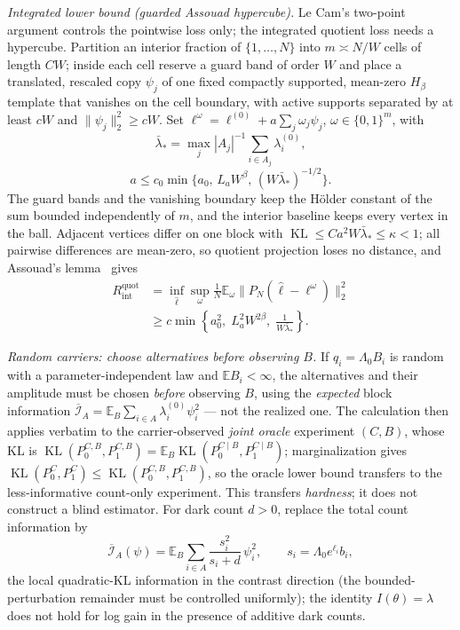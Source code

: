 \emph{Integrated lower bound (guarded Assouad hypercube).} Le Cam's two-point argument controls the pointwise loss only; the integrated quotient loss needs a hypercube. Partition an interior fraction of $\{1,\dots,N\}$ into $m\asymp N/W$ cells of length $CW$; inside each cell reserve a guard band of order $W$ and place a translated, rescaled copy $\psi_j$ of one fixed compactly supported, mean-zero $H_\beta$ template that vanishes on the cell boundary, with active supports separated by at least $cW$ and $\|\psi_j\|_2^2\ge cW$. Set $\ell^\omega=\ell^{(0)}+a\sum_j\omega_j\psi_j$, $\omega\in\{0,1\}^m$, with
\[
\bar\lambda_*=\max_j|A_j|^{-1}\sum_{i\in A_j}\lambda_i^{(0)},
\]
\[
a\le c_0\min\{a_0,\,L_aW^\beta,\,(W\bar\lambda_*)^{-1/2}\}.
\]
The guard bands and the vanishing boundary keep the H\"older constant of the sum bounded independently of $m$, and the interior baseline keeps every vertex in the ball. Adjacent vertices differ on one block with $\operatorname{KL}\le Ca^2W\bar\lambda_*\le\kappa<1$; all pairwise differences are mean-zero, so quotient projection loses no distance, and Assouad's lemma~\cite{Tsybakov2009} gives
\begin{equation}
\begin{aligned}
R_{\mathrm{int}}^{\mathrm{quot}}
&=\inf_{\hat\ell}\sup_\omega\frac1N\mathbb E_\omega\|P_N(\hat\ell-\ell^\omega)\|_2^2\\
&\ge c\min\left\{a_0^2,\;L_a^2W^{2\beta},\;\frac1{W\bar\lambda_*}\right\}.
\end{aligned}
\tag{D.12}
\end{equation}

\emph{Random carriers: choose alternatives before observing $B$.} If $q_i=\Lambda_0B_i$ is random with a parameter-independent law and $\mathbb EB_i<\infty$, the alternatives and their amplitude must be chosen \emph{before} observing $B$, using the \emph{expected} block information $\overline{\mathcal I}_A=\mathbb E_B\sum_{i\in A}\lambda_i^{(0)}\psi_i^2$ --- not the realized one. The calculation then applies verbatim to the carrier-observed \emph{joint oracle} experiment $(C,B)$, whose KL is $\operatorname{KL}(P_0^{C,B},P_1^{C,B})=\mathbb E_B\operatorname{KL}(P_0^{C\mid B},P_1^{C\mid B})$; marginalization gives $\operatorname{KL}(P_0^{C},P_1^{C})\le\operatorname{KL}(P_0^{C,B},P_1^{C,B})$, so the oracle lower bound transfers to the less-informative count-only experiment. This transfers \emph{hardness}; it does not construct a blind estimator. For dark count $d>0$, replace the total count information by
\[
\overline{\mathcal I}_A(\psi)=\mathbb E_B\sum_{i\in A}\frac{s_i^2}{s_i+d}\,\psi_i^2,
\qquad s_i=\Lambda_0e^{\ell_i}b_i,
\]
the local quadratic-KL information in the contrast direction (the bounded-perturbation remainder must be controlled uniformly); the identity $I(\theta)=\lambda$ does not hold for log gain in the presence of additive dark counts.

